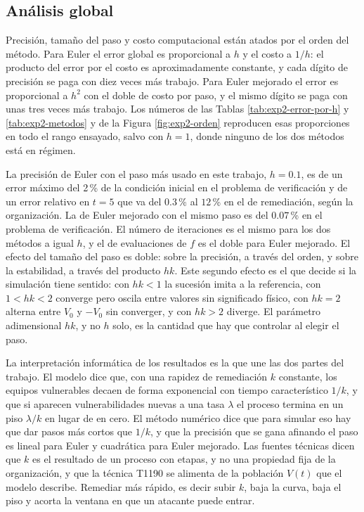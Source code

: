 \subsection{Análisis global}
\label{subsec:dis-global}

Precisión, tamaño del paso y costo computacional están atados por el orden del método. Para
Euler el error global es proporcional a $h$ y el costo a $1/h$: el producto del error por el
costo es aproximadamente constante, y cada dígito de precisión se paga con diez veces más
trabajo. Para Euler mejorado el error es proporcional a $h^2$ con el doble de costo por paso, y
el mismo dígito se paga con unas tres veces más trabajo. Los números de las Tablas
\ref{tab:exp2-error-por-h} y \ref{tab:exp2-metodos} y de la Figura \ref{fig:exp2-orden}
reproducen esas proporciones en todo el rango ensayado, salvo con $h = 1$, donde ninguno de los
dos métodos está en régimen.

La precisión de Euler con el paso más usado en este trabajo, $h = 0.1$, es de un error máximo
del 2\,\% de la condición inicial en el problema de verificación y de un error relativo en
$t = 5$ que va del $0.3$\,\% al $12$\,\% en el de remediación, según la organización. La de Euler mejorado con
el mismo paso es del $0.07$\,\% en el problema de verificación. El número de iteraciones es el
mismo para los dos métodos a igual $h$, y el de evaluaciones de $f$ es el doble para Euler
mejorado. El efecto del tamaño del paso es doble: sobre la precisión, a través del orden, y
sobre la estabilidad, a través del producto $hk$. Este segundo efecto es el que decide si la
simulación tiene sentido: con $hk < 1$ la sucesión imita a la referencia, con $1 < hk < 2$
converge pero oscila entre valores sin significado físico, con $hk = 2$ alterna entre $V_0$ y
$-V_0$ sin converger, y con $hk > 2$ diverge. El
parámetro adimensional $hk$, y no $h$ solo, es la cantidad que hay que controlar al elegir el
paso.

La interpretación informática de los resultados es la que une las dos partes del trabajo. El
modelo dice que, con una rapidez de remediación $k$ constante, los equipos vulnerables decaen
de forma exponencial con tiempo característico $1/k$, y que si aparecen vulnerabilidades
nuevas a una tasa $\lambda$ el proceso termina en un piso $\lambda/k$ en lugar de en cero. El
método numérico dice que para simular eso hay que dar pasos más cortos que $1/k$, y que la
precisión que se gana afinando el paso es lineal para Euler y cuadrática para Euler mejorado.
Las fuentes técnicas dicen que $k$ es el resultado de un proceso con etapas, y no una propiedad
fija de la organización, y que la técnica T1190 se alimenta de la población $V(t)$ que el modelo
describe. Remediar más rápido, es decir subir $k$, baja la curva, baja el piso y acorta la
ventana en que un atacante puede entrar.
